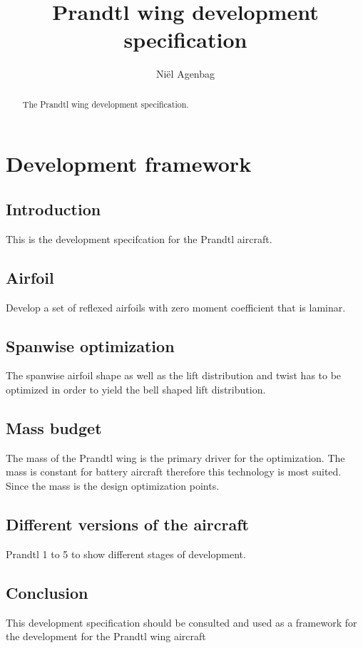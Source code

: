 \documentclass{report}
\begin{document}
\title{Prandtl wing development specification}
\author{Ni\"el Agenbag}

\maketitle

\begin{abstract}
The Prandtl wing development specification.
\end{abstract}


\chapter{Development framework}

\section{Introduction}
This is the development specifcation for the Prandtl aircraft.


\section{Airfoil}

Develop a set of reflexed airfoils with zero moment coefficient that is laminar.

\section{Spanwise optimization}


The spanwise airfoil shape as well as the lift distribution and twist has to be optimized in order to yield the bell shaped lift distribution.

\section{Mass budget}

The mass of the Prandtl wing is the primary driver for the optimization.  The mass is constant for battery aircraft therefore this technology is most suited.  Since the mass is the design optimization points.




\section{Different versions of the aircraft}

Prandtl 1 to 5 to show different stages of development.

\section{Conclusion}
This development specification should be consulted and used as a framework for the development for the Prandtl wing aircraft
\end{document}
